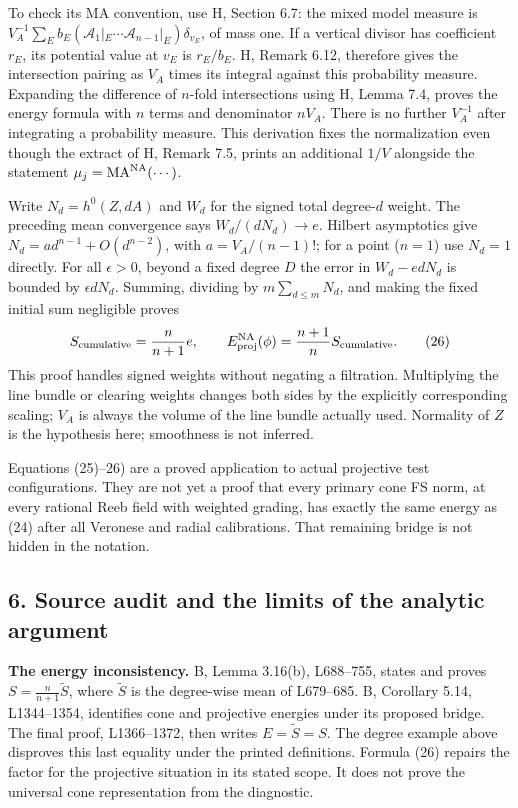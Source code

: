 \documentclass[
  11pt,
]{article}
\begin{document}
To check its MA convention, use H, Section 6.7: the mixed model measure
is \(V_A^{-1}\sum_E b_E(\mathcal A_1|_E\cdots
\mathcal A_{n-1}|_E)\delta_{v_E}\), of mass one. If a vertical divisor
has coefficient \(r_E\), its potential value at \(v_E\) is \(r_E/b_E\).
H, Remark 6.12, therefore gives the intersection pairing as \(V_A\)
times its integral against this probability measure. Expanding the
difference of \(n\)-fold intersections using H, Lemma 7.4, proves the
energy formula with \(n\) terms and denominator \(nV_A\). There is no
further \(V_A^{-1}\) after integrating a probability measure. This
derivation fixes the normalization even though the extract of H, Remark
7.5, prints an additional \(1/V\) alongside the statement
\(\mu_j=\operatorname{MA}^{\rm NA}(\cdots)\).

Write \(N_d=h^0(Z,dA)\) and \(W_d\) for the signed total degree-\(d\)
weight. The preceding mean convergence says \(W_d/(dN_d)\to e\). Hilbert
asymptotics give \(N_d=a d^{n-1}+O(d^{n-2})\), with \(a=V_A/(n-1)!\);
for a point (\(n=1\)) use \(N_d=1\) directly. For all \(\epsilon>0\),
beyond a fixed degree \(D\) the error in \(W_d-e dN_d\) is bounded by
\(\epsilon dN_d\). Summing, dividing by \(m\sum_{d\leq m}N_d\), and
making the fixed initial sum negligible proves \[
 S_{\rm cumulative}=\frac{n}{n+1}e,\qquad
 E^{\rm NA}_{\rm proj}(\phi)=\frac{n+1}{n}S_{\rm cumulative}.
 \tag{26}
\] This proof handles signed weights without negating a filtration.
Multiplying the line bundle or clearing weights changes both sides by
the explicitly corresponding scaling; \(V_A\) is always the volume of
the line bundle actually used. Normality of \(Z\) is the hypothesis
here; smoothness is not inferred.

Equations (25)--26) are a proved application to actual projective test
configurations. They are not yet a proof that every primary cone FS
norm, at every rational Reeb field with weighted grading, has exactly
the same energy as (24) after all Veronese and radial calibrations. That
remaining bridge is not hidden in the notation.

\subsection{6. Source audit and the limits of the analytic
argument}\label{source-audit-and-the-limits-of-the-analytic-argument}

\textbf{The energy inconsistency.} B, Lemma 3.16(b), L688--755, states
and proves \(S=\frac{n}{n+1}\widetilde S\), where \(\widetilde S\) is
the degree-wise mean of L679--685. B, Corollary 5.14, L1344--1354,
identifies cone and projective energies under its proposed bridge. The
final proof, L1366--1372, then writes \(E=\widetilde S=S\). The degree
example above disproves this last equality under the printed
definitions. Formula (26) repairs the factor for the projective
situation in its stated scope. It does not prove the universal cone
representation from the diagnostic.
\end{document}
